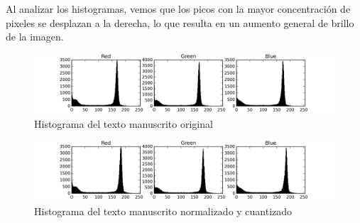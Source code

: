 \documentclass[11pt,spanish]{article}
\begin{document}
Al analizar los histogramas, vemos que los picos con la mayor concentración de pixeles se desplazan a la derecha, lo que resulta en un aumento general de brillo de la imagen.

\begin{figure}[htbp]
	\centering
	\includegraphics[width=1\textwidth]{../words_image_histogram.jpg}
	\caption{Histograma del texto manuscrito original}
	\label{hist_original_word}
\end{figure}

\begin{figure}[htbp]
	\centering
	\includegraphics[width=1\textwidth]{../words_quantized_image_histogram.jpg}
	\caption{Histograma del texto manuscrito normalizado y cuantizado}
	\label{hist_quantized_word}
\end{figure}
\end{document}
